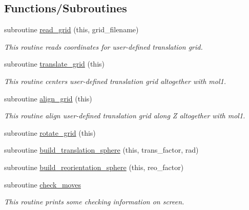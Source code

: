 \subsection*{Functions/\+Subroutines}
\begin{DoxyCompactItemize}
\item 
subroutine \hyperlink{namespacemod__read__grids_aef0317c21ab86e2e970824fb37f613e7}{read\+\_\+grid} (this, grid\+\_\+filename)
\begin{DoxyCompactList}\small\item\em This routine reads coordinates for user-\/defined translation grid. \end{DoxyCompactList}\item 
subroutine \hyperlink{namespacemod__read__grids_ac22d113a654f79569a6fe3d747c7676e}{translate\+\_\+grid} (this)
\begin{DoxyCompactList}\small\item\em This routine centers user-\/defined translation grid altogether with mol1. \end{DoxyCompactList}\item 
subroutine \hyperlink{namespacemod__read__grids_a09768b7e5dbb3769d5babf64f3e9d81e}{align\+\_\+grid} (this)
\begin{DoxyCompactList}\small\item\em This routine align user-\/defined translation grid along Z altogether with mol1. \end{DoxyCompactList}\item 
subroutine \hyperlink{namespacemod__read__grids_a8da3c9d08e5085b9badea630f01b0666}{rotate\+\_\+grid} (this)
\item 
subroutine \hyperlink{namespacemod__read__grids_a4285bde2d44b92f9fcc792dfeebb1eae}{build\+\_\+translation\+\_\+sphere} (this, trans\+\_\+factor, rad)
\item 
subroutine \hyperlink{namespacemod__read__grids_aa9f66d2873344e2a319f7eddb09df558}{build\+\_\+reorientation\+\_\+sphere} (this, reo\+\_\+factor)
\item 
subroutine \hyperlink{namespacemod__read__grids_a318177c120a409fe4cef7d1785b626ac}{check\+\_\+moves}
\begin{DoxyCompactList}\small\item\em This routine prints some checking information on screen. \end{DoxyCompactList}\end{DoxyCompactItemize}

